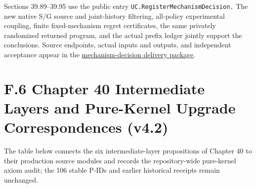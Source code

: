 \documentclass[
  english,
  11pt,
  oneside]{book}
\begin{document}
Sections 39.89--39.95 use the public entry \nolinkurl{UC.RegisterMechanismDecision.} The new native S/G source and joint-history filtering, all-policy experimental coupling, finite fixed-mechanism regret certificates, the same privately randomized returned program, and the actual prefix ledger jointly support the conclusions. Source endpoints, actual inputs and outputs, and independent acceptance appear in the \href{../formalization/ueot-core/docs/compression/theory_completion/unified_closure/mechanism_decision_closure_v1/README.md}{mechanism-decision delivery package}.

\section{F.6 Chapter 40 Intermediate Layers and Pure-Kernel Upgrade Correspondences (v4.2)}\label{f.6-chapter-40-intermediate-layers-and-pure-kernel-upgrade-correspondences-v4.2}

The table below connects the six intermediate-layer propositions of Chapter 40 to their production source modules and records the repository-wide pure-kernel axiom audit; the 106 stable P-IDs and earlier historical receipts remain unchanged.
\end{document}
